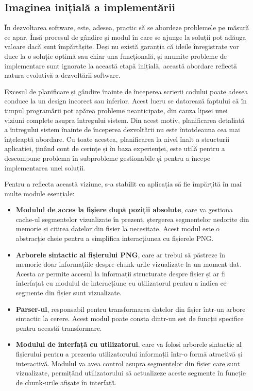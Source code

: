 \documentclass[a4paper,12pt]{report}
\begin{document}
\subsection{Imaginea inițială a implementării}

În dezvoltarea software, este, adesea, practic să se abordeze problemele pe măsură ce apar.
Însă procesul de gândire și modul în care se ajunge la soluții
pot adăuga valoare dacă sunt împărtășite.
Deși nu există garanția că ideile înregistrate vor duce
la o soluție optimă sau chiar una funcțională,
și anumite probleme de implementare sunt ignorate la această etapă inițială,
această abordare reflectă natura evolutivă a dezvoltării software.

Excesul de planificare și gândire înainte de începerea scrierii codului
poate adesea conduce la un design incorect sau inferior.
Acest lucru se datorează faptului că în timpul programării pot apărea probleme neanticipate,
din cauza lipsei unei viziuni complete asupra întregului sistem.
Din acest motiv, planificarea detaliată a întregului sistem înainte de începerea dezvoltării
nu este întotdeauna cea mai înțeleaptă abordare.
Cu toate acestea, planificarea la nivel înalt a structurii aplicației,
ținând cont de cerințe și în baza experienței,
este utilă pentru a descompune problema în subprobleme gestionabile
și pentru a începe implementarea unei soluții.

Pentru a reflecta această viziune, s-a stabilit ca aplicația
să fie împărțită în mai multe module esențiale:
\begin{itemize}
  \item 
  \textbf{Modulul de acces la fișiere după poziții absolute},
  care va gestiona cache-ul segmentelor vizualizate în prezent,
  ștergerea segmentelor nedorite din memorie și citirea datelor din fișier la necesitate.
  Acest modul este o abstracție cheie pentru a simplifica interacțiunea cu fișierele \ac{PNG}.

  \item
  \textbf{Arborele sintactic al fișierului \ac{PNG}},
  care ar trebui să păstreze în memorie doar informațiile despre
  chunk-urile vizualizate la un moment dat.
  Acesta ar permite accesul la informații structurate despre fișier
  și ar fi interfațat cu modulul de interacțiune cu utilizatorul
  pentru a indica ce segmente din fișier sunt vizualizate.

  \item
  \textbf{Parser-ul}, responsabil pentru transformarea datelor
  din fișier într-un arbore sintactic la cerere.
  Acest modul poate consta dintr-un set de funcții specifice pentru această transformare.

  \item
  \textbf{Modulul de interfață cu utilizatorul},
  care va folosi arborele sintactic al fișierului pentru
  a prezenta utilizatorului informații într-o formă atractivă și interactivă.
  Modulul va avea control asupra segmentelor din fișier care sunt vizualizate,
  permițând utilizatorului să actualizeze aceste segmente
  în funcție de chunk-urile afișate în interfață.
\end{itemize}
\end{document}
